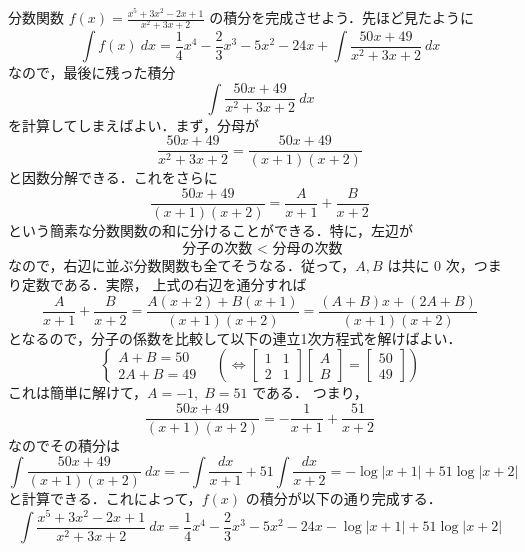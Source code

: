 \documentclass[10pt, uplatex, dvipdfmx]{jsarticle}
\theoremstyle{definition}
\numberwithin{equation}{section}
\newcommand{\ds}{\displaystyle}
\begin{document}
分数関数 $\ds f(x) = \frac{x^5+3x^2-2x+1}{x^2+3x+2}$ の積分を完成させよう．先ほど見たように
\[
  \int f(x) \ dx = \frac{1}{4}x^4-\frac{2}{3}x^3-5x^2-24x + \int \frac{50x+49}{x^2+3x+2} \ dx
\]
なので，最後に残った積分
\[
  \int \frac{50x+49}{x^2+3x+2}\ dx
\]
を計算してしまえばよい．まず，分母が
\[
  \frac{50x+49}{x^2+3x+2} = \frac{50x+49}{(x+1)(x+2)}
\]
と因数分解できる．これをさらに
\[
  \frac{50x+49}{(x+1)(x+2)} = \frac{A}{x+1} + \frac{B}{x+2}
\]
という簡素な分数関数の和に分けることができる．特に，左辺が
\[
  \text{ 分子の次数 } < \text{ 分母の次数}
\]
なので，右辺に並ぶ分数関数も全てそうなる．従って，$A, B$ は共に $0$ 次，つまり定数である．実際，
上式の右辺を通分すれば
\[
  \frac{A}{x+1} + \frac{B}{x+2} = \frac{A(x+2)+B(x+1)}{(x+1)(x+2)} = \frac{(A+B)x + (2A+B)}{(x+1)(x+2)}
\]
となるので，分子の係数を比較して以下の連立1次方程式を解けばよい．
\[
  \begin{cases}
    A+B=50\\
    2A+B=49
  \end{cases} \quad \left( \Longleftrightarrow \left[
      \begin{array}{rr}
        1 & 1\\
        2 & 1
      \end{array}
      \right] \left[
        \begin{array}{r}
          A\\
          B
        \end{array}
      \right] = \left[
        \begin{array}{r}
          50\\
          49
        \end{array}
      \right] \right)
\]
これは簡単に解けて，$A=-1, \; B=51$ である． つまり，
\[
  \frac{50x+49}{(x+1)(x+2)} = -\frac{1}{x+1} + \frac{51}{x+2}
\]
なのでその積分は
\[
  \int \frac{50x+49}{(x+1)(x+2)} \ dx = -\int\frac{dx}{x+1} + 51\int
  \frac{dx}{x+2}= -\log|x+1| +51\log|x+2|
\]
と計算できる．これによって，$f(x)$ の積分が以下の通り完成する．
\[
  \int \frac{x^5+3x^2-2x+1}{x^2+3x+2} \ dx = \frac{1}{4}x^4 -
  \frac{2}{3}x^3-5x^2-24x -\log|x+1| + 51 \log |x+2|
\]

\newpage
\end{document}
